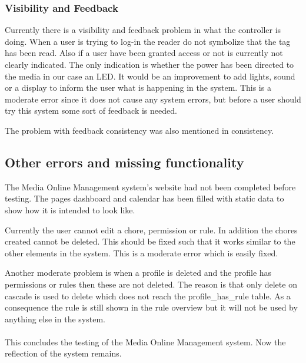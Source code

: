 \subsubsection{Visibility and Feedback}
Currently there is a visibility and feedback problem in what the controller is doing. When a user is trying to log-in the reader do not symbolize that the tag has been read. Also if a user have been granted access or not is currently not clearly indicated. The only indication is whether the power has been directed to the media in our case an LED. It would be an improvement to add lights, sound or a display to inform the user what is happening in the system. This is a moderate error since it does not cause any system errors, but before a user should try this system some sort of feedback is needed.

The problem with feedback consistency was also mentioned in consistency.    


\subsection{Other errors and missing functionality}
The Media Online Management system's website had not been completed before testing. The pages dashboard and calendar has been filled with static data to show how it is intended to look like. 

Currently the user cannot edit a chore, permission or rule. In addition the chores created cannot be deleted. This should be fixed such that it works similar to the other elements in the system. This is a moderate error which is easily fixed.

Another moderate problem is when a profile is deleted and the profile has permissions or rules then these are not deleted. The reason is that only delete on cascade is used to delete which does not reach the profile\_has\_rule table. As a consequence the rule is still shown in the rule overview but it will not be used by anything else in the system.\\\\

This concludes the testing of the Media Online Management system. Now the reflection of the system remains. 